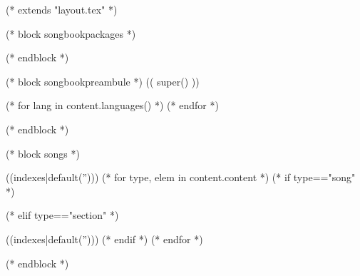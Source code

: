 

(* extends "layout.tex" *)

(* block songbookpackages *)
\usepackage[((booktype)),
            (* for option in bookoptions *)((option)),
            (* endfor *)
            (* for instrument in instruments *)((instrument)),
            (* endfor *)]{SongbookUtils}
(* endblock *)

(* block songbookpreambule *)
   (( super() ))

   (* for lang in content.languages() *)
   (* endfor *)
   \usepackage[((lang))]{babel}

   \usepackage{graphicx}
   \graphicspath{{((datadir))/img/}}

   \makeatletter
   \makeatother
(* endblock *)

(* block songs *)

   \begin{songs}{((indexes|default('')))}
      (* for type, elem in content.content *)
      (* if type=="song" *)
        
      (* elif type=="section" *)
        \end{songs}
        \begin{songs}{((indexes|default('')))}
      (* endif *)
      (* endfor *)
   \end{songs}
(* endblock *)
